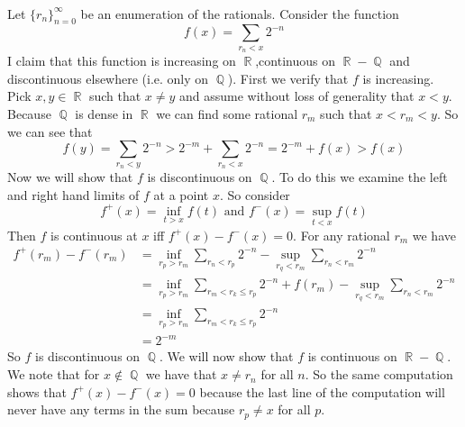 \documentclass{article}
\DeclareMathOperator{\Q}{\mathbb{Q}}
\DeclareMathOperator{\R}{\mathbb{R}}
\newcommand{\problem}[1]{\noindent{\textbf{Problem #1}}\\}
\begin{document}
\problem{3.5.10}
Let $\{r_n\}_{n = 0}^\infty$ be an enumeration of the rationals. Consider the function
\[
f(x) = \sum_{r_n < x} 2^{-n}
\]
I claim that this function is increasing on $\R$,continuous on $\R - \Q$ and discontinuous elsewhere (i.e. only on $\Q$). First we verify that $f$ is increasing. Pick $x,y \in \R$ such that $x\neq y$ and assume without loss of generality that $x < y$. Because $\Q$ is dense in $\R$ we can find some rational $r_m$ such that $x < r_m < y$. So we can see that
\[
f(y) = \sum_{r_n < y} 2^{-n} > 2^{-m} + \sum_{r_n < x}2^{-n} = 2^{-m} + f(x) > f(x) 
\]
Now we will show that $f$ is discontinuous on $\Q$. To do this we examine the left and right hand limits of $f$ at a point $x$. So consider
\[
f^+(x) = \inf_{t > x} f(t) \text{ and } f^{-}(x) = \sup_{t < x} f(t)
\]
Then $f$ is continuous at $x$ iff $f^{+}(x) - f^-(x) = 0$. For any rational $r_m$ we have
\begin{align*}
f^{+}(r_m) - f^-(r_m) &= \inf_{r_p > r_m}\sum_{r_n < r_p} 2^{-n} - \sup_{r_q < r_m}\sum_{r_n < r_m} 2^{-n} \\
&= \inf_{r_p > r_m} \sum_{r_m < r_k \leq r_p} 2^{-n}  + f(r_m) - \sup_{r_q < r_m}\sum_{r_n < r_m} 2^{-n} \\ 
&= \inf_{r_p > r_m} \sum_{r_m < r_k \leq r_p} 2^{-n} \\
&= 2^{-m}
\end{align*}
So $f$ is discontinuous on $\Q$. We will now show that $f$ is continuous on $\R - \Q$. We note that for $x \not\in \Q$ we have that $x \neq r_n$ for all $n$. So the same computation shows that $f^{+}(x) - f^-(x) = 0$ because the last line of the computation will never have any terms in the sum because $r_p \neq x$ for all $p$. 
  
\pagebreak
\end{document}
